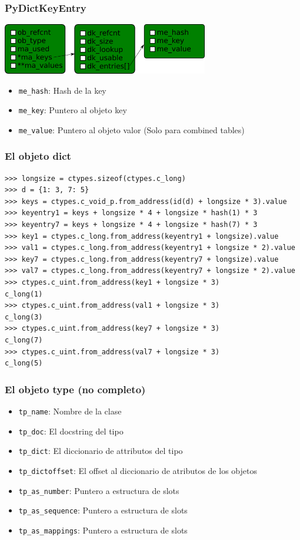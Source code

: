 \documentclass[10pt]{beamer}
\begin{document}
  \begin{frame}[containsverbatim]
    \frametitle{PyDictKeyEntry}
    \begin{center}\includegraphics[width=9cm]{img/Dict.png}\end{center}
    \begin{itemize}
      \item \verb+me_hash+: Hash de la key
      \item \verb+me_key+: Puntero al objeto key
      \item \verb+me_value+: Puntero al objeto valor (Solo para combined tables)
    \end{itemize}
  \end{frame}

  \begin{frame}[containsverbatim]
    \frametitle{El objeto dict}
    \begin{verbatim}
>>> longsize = ctypes.sizeof(ctypes.c_long)
>>> d = {1: 3, 7: 5}
>>> keys = ctypes.c_void_p.from_address(id(d) + longsize * 3).value
>>> keyentry1 = keys + longsize * 4 + longsize * hash(1) * 3
>>> keyentry7 = keys + longsize * 4 + longsize * hash(7) * 3
>>> key1 = ctypes.c_long.from_address(keyentry1 + longsize).value
>>> val1 = ctypes.c_long.from_address(keyentry1 + longsize * 2).value
>>> key7 = ctypes.c_long.from_address(keyentry7 + longsize).value
>>> val7 = ctypes.c_long.from_address(keyentry7 + longsize * 2).value
>>> ctypes.c_uint.from_address(key1 + longsize * 3)
c_long(1)
>>> ctypes.c_uint.from_address(val1 + longsize * 3)
c_long(3)
>>> ctypes.c_uint.from_address(key7 + longsize * 3)
c_long(7)
>>> ctypes.c_uint.from_address(val7 + longsize * 3)
c_long(5)
    \end{verbatim}
  \end{frame}

  \begin{frame}[containsverbatim]
    \frametitle{El objeto type (no completo)}
    \begin{itemize}
      \item \verb+tp_name+: Nombre de la clase
      \item \verb+tp_doc+: El docstring del tipo
      \item \verb+tp_dict+: El diccionario de attributos del tipo
      \item \verb+tp_dictoffset+: El offset al diccionario de atributos de los objetos
      \item \verb+tp_as_number+: Puntero a estructura de slots
      \item \verb+tp_as_sequence+: Puntero a estructura de slots
      \item \verb+tp_as_mappings+: Puntero a estructura de slots
    \end{itemize}
  \end{frame}
\end{document}
